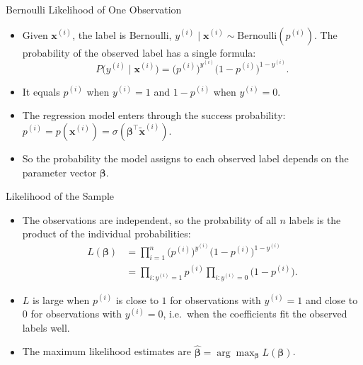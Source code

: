 \begin{frame}{Bernoulli Likelihood of One Observation}
    \begin{itemize}
        \item Given $\mathbf{x}^{(i)}$, the label is Bernoulli, $y^{(i)} \mid \mathbf{x}^{(i)} \sim \text{Bernoulli}(p^{(i)})$. The probability of the observed label has a single formula:
        \[
            P\big(y^{(i)} \mid \mathbf{x}^{(i)}\big) = \big(p^{(i)}\big)^{y^{(i)}} \big(1 - p^{(i)}\big)^{1 - y^{(i)}}.
        \]
        \item It equals $p^{(i)}$ when $y^{(i)} = 1$ and $1 - p^{(i)}$ when $y^{(i)} = 0$.
        \item The regression model enters through the success probability: $p^{(i)} = p(\mathbf{x}^{(i)}) = \sigma(\symbf{\beta}^\top \tilde{\mathbf{x}}^{(i)})$.
        \item So the probability the model assigns to each observed label depends on the parameter vector $\symbf{\beta}$.
    \end{itemize}
\end{frame}


\begin{frame}{Likelihood of the Sample}
    \begin{itemize}
        \item The observations are independent, so the probability of all $n$ labels is the product of the individual probabilities:
        \[
            \begin{aligned}
                L(\symbf{\beta}) &= \prod_{i=1}^{n} \big(p^{(i)}\big)^{y^{(i)}} \big(1 - p^{(i)}\big)^{1 - y^{(i)}} \\
                &= \prod_{i : y^{(i)} = 1} p^{(i)} \prod_{i : y^{(i)} = 0} \big(1 - p^{(i)}\big).
            \end{aligned}
        \]
        \item $L$ is large when $p^{(i)}$ is close to $1$ for observations with $y^{(i)} = 1$ and close to $0$ for observations with $y^{(i)} = 0$, i.e.\ when the coefficients fit the observed labels well.
        \item The maximum likelihood estimates are $\hat{\symbf{\beta}} = \arg\max_{\symbf{\beta}} L(\symbf{\beta})$.
    \end{itemize}
\end{frame}


